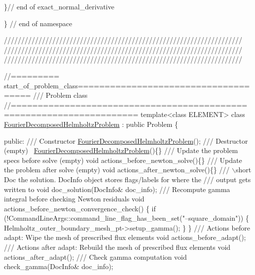 \begin{DoxyCodeInclude}
 \}\textcolor{comment}{// end of exact\_normal\_derivative}
 
 

\} \textcolor{comment}{// end of namespace}


\textcolor{comment}{}
\textcolor{comment}{/////////////////////////////////////////////////////////////////////}
\textcolor{comment}{/////////////////////////////////////////////////////////////////////}
\textcolor{comment}{/////////////////////////////////////////////////////////////////////}
\textcolor{comment}{}

\textcolor{comment}{//========= start\_of\_problem\_class=====================================}\textcolor{comment}{}
\textcolor{comment}{/// Problem class }
\textcolor{comment}{}\textcolor{comment}{//=====================================================================}
\textcolor{keyword}{template}<\textcolor{keyword}{class} ELEMENT> 
\textcolor{keyword}{class }\hyperlink{classFourierDecomposedHelmholtzProblem}{FourierDecomposedHelmholtzProblem} : \textcolor{keyword}{public} Problem
\{
 
\textcolor{keyword}{public}:
 \textcolor{comment}{}
\textcolor{comment}{ /// Constructor}
\textcolor{comment}{} \hyperlink{classFourierDecomposedHelmholtzProblem}{FourierDecomposedHelmholtzProblem}();
 \textcolor{comment}{}
\textcolor{comment}{ /// Destructor (empty)}
\textcolor{comment}{} ~\hyperlink{classFourierDecomposedHelmholtzProblem}{FourierDecomposedHelmholtzProblem}()\{\}
 \textcolor{comment}{}
\textcolor{comment}{ /// Update the problem specs before solve (empty)}
\textcolor{comment}{} \textcolor{keywordtype}{void} actions\_before\_newton\_solve()\{\}
 \textcolor{comment}{}
\textcolor{comment}{ /// Update the problem after solve (empty)}
\textcolor{comment}{} \textcolor{keywordtype}{void} actions\_after\_newton\_solve()\{\}
 \textcolor{comment}{}
\textcolor{comment}{ /// \(\backslash\)short Doc the solution. DocInfo object stores flags/labels for where the}
\textcolor{comment}{ /// output gets written to}
\textcolor{comment}{} \textcolor{keywordtype}{void} doc\_solution(DocInfo& doc\_info);
  \textcolor{comment}{}
\textcolor{comment}{ /// Recompute gamma integral before checking Newton residuals}
\textcolor{comment}{} \textcolor{keywordtype}{void} actions\_before\_newton\_convergence\_check()
  \{
   \textcolor{keywordflow}{if} (!CommandLineArgs::command\_line\_flag\_has\_been\_set(\textcolor{stringliteral}{"--square\_domain"}))
    \{
     Helmholtz\_outer\_boundary\_mesh\_pt->setup\_gamma();
    \}
  \}
\textcolor{comment}{}
\textcolor{comment}{ /// Actions before adapt: Wipe the mesh of prescribed flux elements}
\textcolor{comment}{} \textcolor{keywordtype}{void} actions\_before\_adapt();
 \textcolor{comment}{}
\textcolor{comment}{ /// Actions after adapt: Rebuild the mesh of prescribed flux elements}
\textcolor{comment}{} \textcolor{keywordtype}{void} actions\_after\_adapt();
 \textcolor{comment}{}
\textcolor{comment}{ /// Check gamma computation}
\textcolor{comment}{} \textcolor{keywordtype}{void} check\_gamma(DocInfo& doc\_info);
  

\end{DoxyCodeInclude}

